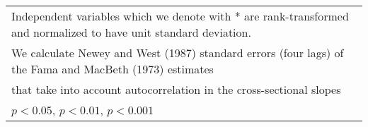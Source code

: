 {\begin{tabular}{l*{6}{c}}
\multicolumn{7}{l}{\footnotesize Independent variables which  we denote with * are rank-transformed and normalized to have unit standard deviation.}\\
\multicolumn{7}{l}{\footnotesize  We calculate Newey and West (1987) standard errors (four lags) of the Fama and MacBeth (1973) estimates }\\
\multicolumn{7}{l}{\footnotesize  that take into account autocorrelation in the cross-sectional slopes}\\
\multicolumn{7}{l}{\footnotesize \sym{*} \(p<0.05\), \sym{**} \(p<0.01\), \sym{***} \(p<0.001\)}\\
\end{tabular}
}
